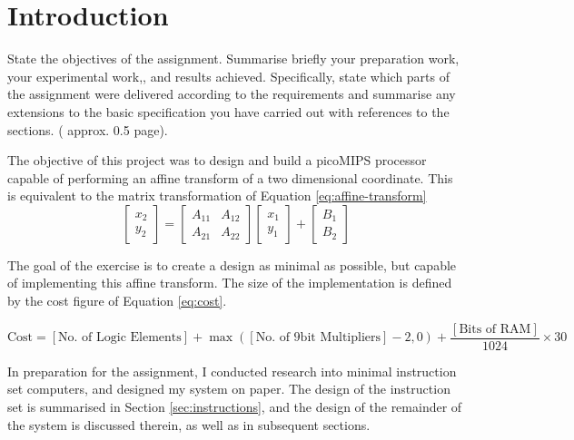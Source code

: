 \section{Introduction}

\review
{
	State the objectives of the assignment. Summarise briefly your preparation work,  your experimental work,, and results achieved. Specifically, state which parts of the assignment were delivered according to the requirements and summarise any extensions to the basic specification you have carried out with references to the sections.  ( approx. 0.5 page).
}

The objective of this project was to design and build a picoMIPS processor capable of performing an affine transform of a two dimensional coordinate. This is equivalent to the matrix transformation of Equation \ref{eq:affine-transform}
\begin{equation}
\begin{bmatrix}
x_2\\
y_2
\end{bmatrix}
=
\begin{bmatrix}
A_{11} & A_{12}\\
A_{21} & A_{22}
\end{bmatrix}
\begin{bmatrix}
x_1\\
y_1
\end{bmatrix}
+
\begin{bmatrix}
B_1\\
B_2
\end{bmatrix}
\label{eq:affine-transform}
\end{equation}

The goal of the exercise is to create a design as minimal as possible, but capable of implementing this affine transform. The size of the implementation is defined by the cost figure of Equation \ref{eq:cost}.

\begin{equation}
	\text{Cost} = [\text{No. of Logic Elements}] + \max([\text{No. of 9bit Multipliers}] -2, 0) + \frac{ [\text{Bits of RAM}]}{1024} \times 30
	\label{eq:cost}
\end{equation}

In preparation for the assignment, I conducted research into minimal instruction set computers, and designed my system on paper. The design of the instruction set is summarised in Section \ref{sec:instructions}, and the design of the remainder of the system is discussed therein, as well as in subsequent sections.

